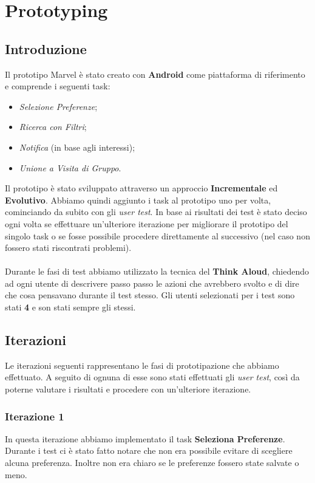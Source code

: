 \section{Prototyping}

\subsection{Introduzione}
Il prototipo Marvel è stato creato con \textbf{Android} come piattaforma di riferimento e comprende i seguenti task:
\begin{itemize}
    \item \textit{Selezione  Preferenze};
    \item \textit{Ricerca con Filtri};
    \item \textit{Notifica} (in base agli interessi);
    \item \textit{Unione a Visita di Gruppo}.
\end{itemize}

Il prototipo è stato sviluppato attraverso un approccio \textbf{Incrementale} ed \textbf{Evolutivo}. Abbiamo quindi aggiunto i task al prototipo uno per volta, cominciando da subito con gli \textit{user test}. In base ai risultati dei test è stato deciso ogni volta se effettuare un'ulteriore iterazione per migliorare il prototipo del singolo task o se fosse possibile procedere direttamente al successivo (nel caso non fossero stati riscontrati problemi). 

\paragraph{}
Durante le fasi di test abbiamo utilizzato la tecnica del \textbf{Think Aloud}, chiedendo ad ogni utente di descrivere passo passo le azioni che avrebbero svolto e di dire che cosa pensavano durante il test stesso. Gli utenti selezionati per i test sono stati \textbf{4} e son stati sempre gli stessi.

\subsection{Iterazioni}
Le iterazioni seguenti rappresentano le fasi di prototipazione che abbiamo effettuato. A seguito di ognuna di esse sono stati effettuati gli \textit{user test}, così da poterne valutare i risultati e procedere con un'ulteriore iterazione.

\subsubsection{Iterazione 1}
In questa iterazione abbiamo implementato il task \textbf{Seleziona Preferenze}. Durante i test ci è stato fatto notare che non era possibile evitare di scegliere alcuna preferenza. Inoltre non era chiaro se le preferenze fossero state salvate o meno.

